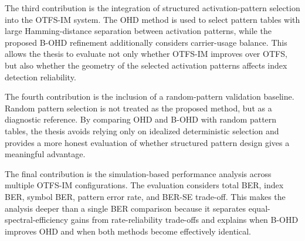 The third contribution is the integration of structured activation-pattern selection into the OTFS-IM system. The OHD method is used to select pattern tables with large Hamming-distance separation between activation patterns, while the proposed B-OHD refinement additionally considers carrier-usage balance. This allows the thesis to evaluate not only whether OTFS-IM improves over OTFS, but also whether the geometry of the selected activation patterns affects index detection reliability.

The fourth contribution is the inclusion of a random-pattern validation baseline. Random pattern selection is not treated as the proposed method, but as a diagnostic reference. By comparing OHD and B-OHD with random pattern tables, the thesis avoids relying only on idealized deterministic selection and provides a more honest evaluation of whether structured pattern design gives a meaningful advantage.

The final contribution is the simulation-based performance analysis across multiple OTFS-IM configurations. The evaluation considers total BER, index BER, symbol BER, pattern error rate, and BER-SE trade-off. This makes the analysis deeper than a single BER comparison because it separates equal-spectral-efficiency gains from rate-reliability trade-offs and explains when B-OHD improves OHD and when both methods become effectively identical.

